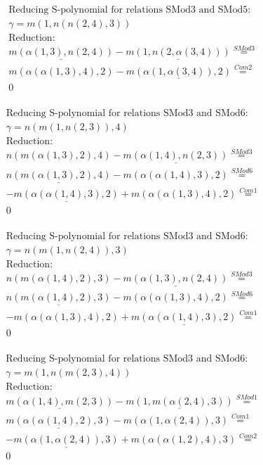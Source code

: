 \documentclass[11pt]{amsart}
\begin{document}
\begin{align*} 
& \text{Reducing S-polynomial for relations SMod3 and SMod5:} \\ 
& \gamma = m(1,n(n(2,4),3)) \\ 
& \text{Reduction}: \\&\underline{m(\alpha(1,3),n(2,4))} - \underline{m(1,n(2,\alpha(3,4)))} \stackrel{ SMod3 }{=}  \\ 
&m(\alpha(\alpha(1,3),4),2) - \underline{m(\alpha(1,\alpha(3,4)),2)} \stackrel{ Com2 }{=}  \\ 
&0\\ 
\end{align*} 
 
\begin{align*} 
& \text{Reducing S-polynomial for relations SMod3 and SMod6:} \\ 
& \gamma = n(m(1,n(2,3)),4) \\ 
& \text{Reduction}: \\&n(m(\alpha(1,3),2),4) - \underline{m(\alpha(1,4),n(2,3))} \stackrel{ SMod3 }{=}  \\ 
&\underline{n(m(\alpha(1,3),2),4)} - m(\alpha(\alpha(1,4),3),2) \stackrel{ SMod6 }{=}  \\ 
& - \underline{m(\alpha(\alpha(1,4),3),2)} + m(\alpha(\alpha(1,3),4),2) \stackrel{ Com1 }{=}  \\ 
&0\\ 
\end{align*} 
 
\begin{align*} 
& \text{Reducing S-polynomial for relations SMod3 and SMod6:} \\ 
& \gamma = n(m(1,n(2,4)),3) \\ 
& \text{Reduction}: \\&n(m(\alpha(1,4),2),3) - \underline{m(\alpha(1,3),n(2,4))} \stackrel{ SMod3 }{=}  \\ 
&\underline{n(m(\alpha(1,4),2),3)} - m(\alpha(\alpha(1,3),4),2) \stackrel{ SMod6 }{=}  \\ 
& - m(\alpha(\alpha(1,3),4),2) + \underline{m(\alpha(\alpha(1,4),3),2)} \stackrel{ Com1 }{=}  \\ 
&0\\ 
\end{align*} 
 
\begin{align*} 
& \text{Reducing S-polynomial for relations SMod3 and SMod6:} \\ 
& \gamma = m(1,n(m(2,3),4)) \\ 
& \text{Reduction}: \\&\underline{m(\alpha(1,4),m(2,3))} - \underline{m(1,m(\alpha(2,4),3))} \stackrel{ SMod1 }{=}  \\ 
&\underline{m(\alpha(\alpha(1,4),2),3)} - m(\alpha(1,\alpha(2,4)),3) \stackrel{ Com1 }{=}  \\ 
& - \underline{m(\alpha(1,\alpha(2,4)),3)} + m(\alpha(\alpha(1,2),4),3) \stackrel{ Com2 }{=}  \\ 
&0\\ 
\end{align*} 
 
\end{document}
